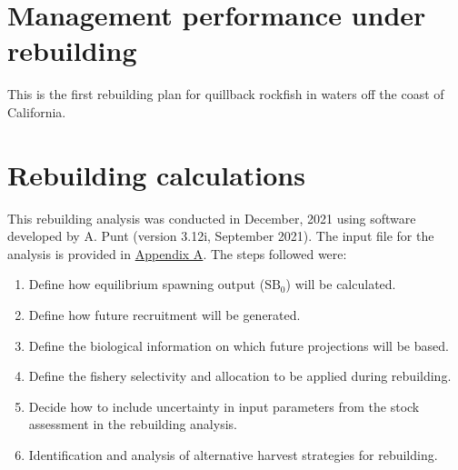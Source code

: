 \documentclass[11pt,
  english,
  letterpaper,
]{article}
\begin{document}
\leavevmode\tagmcend\tagstructend\par


\hypertarget{management-performance-under-rebuilding}{%
\section{Management performance under rebuilding}\label{management-performance-under-rebuilding}}

\leavevmode\tagmcend\tagstructend


This is the first rebuilding plan for quillback rockfish in waters off the coast of California.

\leavevmode\tagmcend\tagstructend\par


\hypertarget{rebuilding-calculations}{%
\section{Rebuilding calculations}\label{rebuilding-calculations}}

\leavevmode\tagmcend\tagstructend


This rebuilding analysis was conducted in December, 2021 using software developed by A. Punt (version 3.12i, September 2021). The input file for the analysis is provided in {\protect\hyperlink{append_a}{Appendix A}\leavevmode\tagmcend\tagstructend}. The steps followed were:

\leavevmode\tagmcend\tagstructend\par

\begin{enumerate}
    \item Define how equilibrium spawning output ($\text{SB}_0$) will be calculated. 
    \item Define how future recruitment will be generated.
    \item Define the biological information on which future projections will be based.
    \item Define the fishery selectivity and allocation to be applied during rebuilding. 
    \item Decide how to include uncertainty in input parameters from the stock assessment in the rebuilding analysis. 
    \item Identification and analysis of alternative harvest strategies for rebuilding. 
\end{enumerate}
\end{document}
